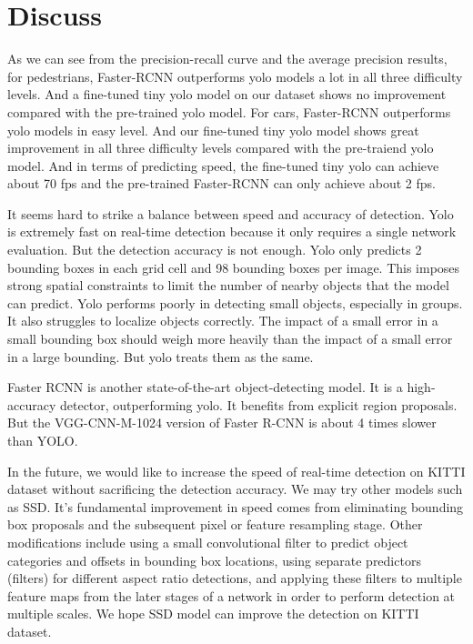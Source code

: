 \section{Discuss}





As we can see from the precision-recall curve and the average precision results, for pedestrians, Faster-RCNN outperforms yolo models a lot in all three difficulty levels. And a fine-tuned tiny yolo model on our dataset shows no improvement compared with the pre-trained yolo model. For cars, Faster-RCNN outperforms yolo models in easy level. And our fine-tuned tiny yolo model shows great improvement in all three difficulty levels compared with the pre-traiend yolo model. And
in terms of predicting speed, the fine-tuned tiny yolo can achieve about 70 fps and the pre-trained Faster-RCNN can only achieve about 2 fps.


It seems hard to strike a balance between speed and accuracy of detection. Yolo is extremely fast on real-time detection because it only requires a single network evaluation. But the detection accuracy is not enough. Yolo only predicts 2 bounding boxes in each grid cell and 98 bounding boxes per image. This imposes strong spatial constraints to limit the number of nearby objects that the model can predict. Yolo performs poorly in detecting small objects, especially in groups. It also struggles to localize objects correctly. The impact of a small error in a small bounding box should weigh more heavily than the impact of a small error in a large bounding. But yolo treats them as the same.

Faster RCNN is another state-of-the-art object-detecting model. It is a high-accuracy detector, outperforming yolo. It benefits from explicit region proposals. But the VGG-CNN-M-1024 version of Faster R-CNN is about 4 times slower than YOLO.

In the future, we would like to increase the speed of real-time detection on KITTI dataset without sacrificing the detection accuracy. We may try other models such as SSD. It's fundamental improvement in speed comes from eliminating bounding box proposals and the subsequent pixel or feature resampling stage. Other modifications include using a small convolutional filter to predict object categories and offsets in bounding box locations, using separate predictors (filters) for different aspect ratio detections, and applying these filters to multiple feature maps from the later stages of a network in order to perform detection at multiple scales. We hope SSD model can improve the detection on KITTI dataset.
